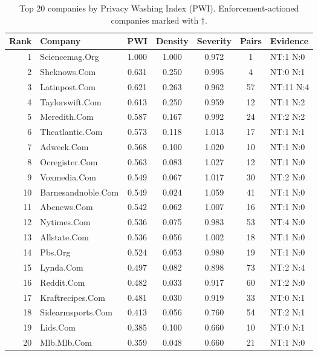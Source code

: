 \begin{table}[t]
\centering
\caption{Top 20 companies by Privacy Washing Index (PWI). Enforcement-actioned companies marked with $\dagger$.}
\label{tab:top20}
\begin{tabular}{rlccccl}
\toprule
Rank & Company & PWI & Density & Severity & Pairs & Evidence \\
\midrule
1 & Sciencemag.Org & 1.000 & 1.000 & 0.972 & 1 & NT:1 N:0 \\
2 & Sheknows.Com & 0.631 & 0.250 & 0.995 & 4 & NT:0 N:1 \\
3 & Latinpost.Com & 0.621 & 0.263 & 0.962 & 57 & NT:11 N:4 \\
4 & Taylorswift.Com & 0.613 & 0.250 & 0.959 & 12 & NT:1 N:2 \\
5 & Meredith.Com & 0.587 & 0.167 & 0.992 & 24 & NT:2 N:2 \\
6 & Theatlantic.Com & 0.573 & 0.118 & 1.013 & 17 & NT:1 N:1 \\
7 & Adweek.Com & 0.568 & 0.100 & 1.020 & 10 & NT:1 N:0 \\
8 & Ocregister.Com & 0.563 & 0.083 & 1.027 & 12 & NT:1 N:0 \\
9 & Voxmedia.Com & 0.549 & 0.067 & 1.017 & 30 & NT:2 N:0 \\
10 & Barnesandnoble.Com & 0.549 & 0.024 & 1.059 & 41 & NT:1 N:0 \\
11 & Abcnews.Com & 0.542 & 0.062 & 1.007 & 16 & NT:1 N:0 \\
12 & Nytimes.Com & 0.536 & 0.075 & 0.983 & 53 & NT:4 N:0 \\
13 & Allstate.Com & 0.536 & 0.056 & 1.002 & 18 & NT:1 N:0 \\
14 & Pbs.Org & 0.524 & 0.053 & 0.980 & 19 & NT:1 N:0 \\
15 & Lynda.Com & 0.497 & 0.082 & 0.898 & 73 & NT:2 N:4 \\
16 & Reddit.Com & 0.482 & 0.033 & 0.917 & 60 & NT:2 N:0 \\
17 & Kraftrecipes.Com & 0.481 & 0.030 & 0.919 & 33 & NT:0 N:1 \\
18 & Sidearmsports.Com & 0.413 & 0.056 & 0.760 & 54 & NT:2 N:1 \\
19 & Lids.Com & 0.385 & 0.100 & 0.660 & 10 & NT:0 N:1 \\
20 & Mlb.Mlb.Com & 0.359 & 0.048 & 0.660 & 21 & NT:1 N:0 \\
\bottomrule
\end{tabular}
\end{table}

